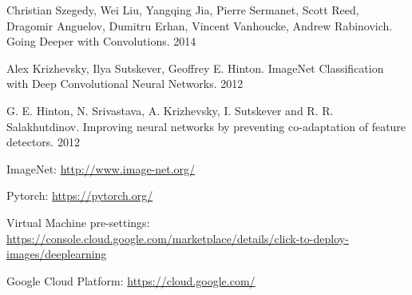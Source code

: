 \documentclass{article}
\begin{document}
\begin{thebibliography}{1}
	Christian Szegedy, Wei Liu, Yangqing Jia, Pierre Sermanet, Scott Reed, Dragomir Anguelov, Dumitru Erhan, Vincent Vanhoucke, Andrew Rabinovich. Going Deeper with Convolutions. 2014
	
	Alex Krizhevsky, Ilya Sutskever, Geoffrey E. Hinton. ImageNet Classification with Deep Convolutional
	Neural Networks. 2012
	
	G. E. Hinton, N. Srivastava, A. Krizhevsky, I. Sutskever and R. R. Salakhutdinov.
	Improving neural networks by preventing co-adaptation of feature detectors. 2012
	
	ImageNet: \url{http://www.image-net.org/}
	
	Pytorch: \url{https://pytorch.org/}
	
	Virtual Machine pre-settings: \url{https://console.cloud.google.com/marketplace/details/click-to-deploy-images/deeplearning}
	
	Google Cloud Platform: \url{https://cloud.google.com/}
	
\end{thebibliography}
\end{document}
